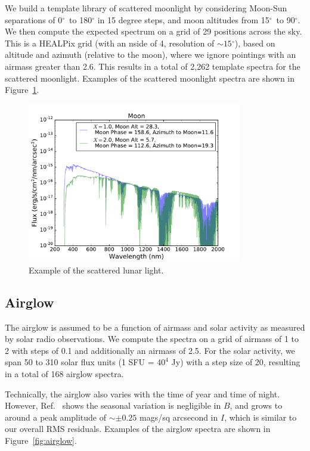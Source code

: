 \documentclass[]{spie}
\newcommand\degree{{^\circ}}
\begin{document}
We build a template library of scattered moonlight by considering Moon-Sun separations of 0$\degree$\ to 180$\degree$ in 15 degree steps, and moon altitudes from 15$\degree$\ to 90$\degree$.  We then compute the expected spectrum on a grid of 29 positions across the sky. This is a HEALPix grid (with an nside of 4, resolution of $\sim15\degree$), based on altitude and azimuth (relative to the moon), where we ignore pointings with an airmass greater than 2.6. This results in a total of 2,262 template spectra for the scattered moonlight. Examples of the scattered moonlight spectra are shown in Figure~\ref{fig:moon}.

\begin{figure}[ht]
  \begin{center}
  \includegraphics[height=7cm]{plots/moon.pdf}
  \end{center}
  \caption{Example of the scattered lunar light. \label{fig:moon}}
\end{figure}


\subsection{Airglow}

The airglow is assumed to be a function of airmass and solar activity as measured by solar radio observations.  We compute the spectra on a grid of airmass of 1 to 2 with steps of 0.1 and additionally an airmass of 2.5.  For the solar activity, we span 50 to 310 solar flux units (1 SFU = 4$0^4$ Jy) with a step size of 20, resulting in a total of 168 airglow spectra. 

Technically, the airglow also varies with the time of year and time of night. However, Ref.~ shows the seasonal variation is negligible in $B$, and grows to around a peak amplitude of $\sim\pm0.25$ mags/sq arcsecond in $I$, which is similar to our overall RMS residuals. Examples of the airglow spectra are shown in Figure~\ref{fig:airglow}. 
\end{document}
